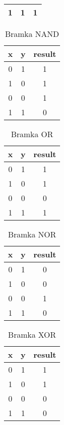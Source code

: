 \documentclass[a4paper]{article}
\begin{document}
\begin{center}
\begin{table}[H]
\begin{tabular}{|c|c|c|}
             \hline
             1&1&1\\
             \hline
             \end{tabular}
    \end{table}
\begin{table}[H]
        \centering\caption{Bramka NAND}
        \begin{tabular}{|c|c|c|}
            \hline
             x&y&result  \\
             \hline
             0&1&1 \\
             \hline
             1&0&1 \\
             \hline
             0&0&1\\
             \hline
             1&1&0\\
             \hline
             \end{tabular}
    \end{table}
\begin{table}[H]
        \centering\caption{Bramka OR}
        \begin{tabular}{|c|c|c|}
            \hline
             x&y&result  \\
             \hline
             0&1&1 \\
             \hline
             1&0&1 \\
             \hline
             0&0&0\\
             \hline
             1&1&1\\
             \hline
             \end{tabular}
    \end{table}
\begin{table}[H]
        \centering\caption{Bramka NOR}
        \begin{tabular}{|c|c|c|}
            \hline
             x&y&result  \\
             \hline
             0&1&0 \\
             \hline
             1&0&0 \\
             \hline
             0&0&1\\
             \hline
             1&1&0\\
             \hline
             \end{tabular}
    \end{table}
\begin{table}[H]
        \centering\caption{Bramka XOR}
        \begin{tabular}{|c|c|c|}
            \hline
             x&y&result  \\
             \hline
             0&1&1 \\
             \hline
             1&0&1 \\
             \hline
             0&0&0\\
             \hline
             1&1&0\\
             \hline
             \end{tabular}
    \end{table}
\end{center}
\end{document}

